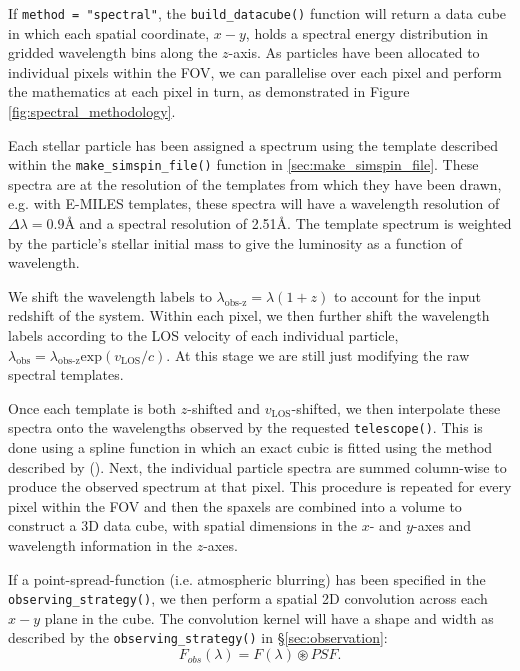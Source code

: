 \documentclass[
  journal=pasa,
  manuscript=research-paper, %
  year=2020,
  volume=37,
]{cup-journal}
\newcommand{\citetoggle}[1]{\citeauthor{#1} (\citeyear{#1})}
\newcommand{\makesimspinfile}[1]{\texttt{make\_simspin\_file()}#1}
\newcommand{\telescope}[1]{\texttt{telescope()}#1}
\newcommand{\observingstrategy}[1]{\texttt{observing\_strategy()}#1}
\newcommand{\builddatacube}[1]{\texttt{build\_datacube()}#1}
\begin{document}
If \texttt{method = "spectral"}, the \builddatacube{} function will return a data cube in which each spatial coordinate, $x-y$, holds a spectral energy distribution in gridded wavelength bins along the $z$-axis.
As particles have been allocated to individual pixels within the FOV, we can parallelise over each pixel and perform the mathematics at each pixel in turn, as demonstrated in Figure \ref{fig:spectral_methodology}.

Each stellar particle has been assigned a spectrum using the template described within the \makesimspinfile{} function in \cref{sec:make_simspin_file}. 
These spectra are at the resolution of the templates from which they have been drawn, e.g. with E-MILES templates, these spectra will have a wavelength resolution of $\Delta \lambda = 0.9$\AA{} and a spectral resolution of 2.51\AA.
The template spectrum is weighted by the particle's stellar initial mass to give the luminosity as a function of wavelength.
    
We shift the wavelength labels to $\lambda_{\text{obs-z}} = \lambda (1 + z)$ to account for the input redshift of the system. 
Within each pixel, we then further shift the wavelength labels according to the LOS velocity of each individual particle, $\lambda_{\text{obs}} = \lambda_{\text{obs-z}} \text{exp}(v_{\text{LOS}}/c)$. 
At this stage we are still just modifying the raw spectral templates.

Once each template is both $z$-shifted and $v_{\text{LOS}}$-shifted, we then interpolate these spectra onto the wavelengths observed by the requested \telescope{}. 
This is done using a spline function in which an exact cubic is fitted using the method described by \citetoggle{Forsythe1977ComputerMethods}{.}
Next, the individual particle spectra are summed column-wise to produce the observed spectrum at that pixel. This procedure is repeated for every pixel within the FOV and then the spaxels are combined into a volume to construct a 3D data cube, with spatial dimensions in the $x$- and $y$-axes and wavelength information in the $z$-axes. 

If a point-spread-function (i.e. atmospheric blurring) has been specified in the \observingstrategy, we then perform a spatial 2D convolution across each $x-y$ plane in the cube. 
The convolution kernel will have a shape and width as described by the \observingstrategy{}  in \S \ref{sec:observation}:
\begin{equation}
    F_{obs}(\lambda) = F(\lambda) \circledast PSF.
\end{equation}
\end{document}
